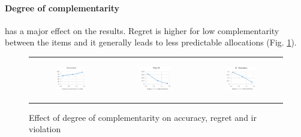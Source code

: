 \documentclass[]{article}
\begin{document}
\paragraph{Degree of complementarity} has a major effect on the results. Regret is higher for low complementarity between the items and it generally leads to less predictable allocations (Fig. \ref{degComplementarity}).
\begin{figure}[!ht]
		\begin{tabular}{c c c}
		\begin{subfigure}{0.3\textwidth}
			
			\begin{center}
				\includegraphics[width=38mm]{res/degComplementarity_accuracy-cropped.pdf}
			\end{center}
			
		\end{subfigure} &
	\begin{subfigure}{0.3\textwidth}
		\includegraphics[width=38mm]{res/degComplementarity_regret-cropped.pdf}
	\end{subfigure} &
\begin{subfigure}{0.3\textwidth}
	\includegraphics[width=38mm]{res/degComplementarity_ir-violation-cropped.pdf}
\end{subfigure}
\end{tabular}
\caption{Effect of degree of complementarity on accuracy, regret and ir violation}
\label{degComplementarity}
\end{figure}
\vspace{-5mm}
\end{document}
